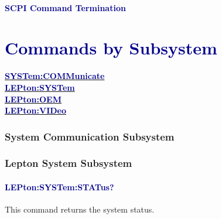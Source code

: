 \documentclass[10pt,a4paper]{article}
\begin{document}
\subsection*{\textcolor{darkblue}{SCPI Command Termination}}

\part*{\textcolor{darkblue}{Commands by Subsystem}}
\begin{spacing}{2}
    \hyperref[sec:SystemCommunicate]{\textbf{\large\textcolor{darkblue}{SYSTem:COMMunicate}}}\\
    \hyperref[sec:LeptonSystem]{\textbf{\large\textcolor{darkblue}{LEPton:SYSTem}}}\\
    \hyperref[sec:LeptonOem]{\textbf{\large\textcolor{darkblue}{LEPton:OEM}}}\\
    \hyperref[sec:LeptonVideo]{\textbf{\large\textcolor{darkblue}{LEPton:VIDeo}}}\\
\end{spacing}

\section*{\label{sec:SystemCommunicate}System Communication Subsystem}

\section*{\label{sec:LeptonSystem}Lepton System Subsystem}


\subsection*{\textcolor{darkblue}{LEPton:SYSTem:STATus?}}

\vspace{12pt}

This command returns the system status.
\end{document}
